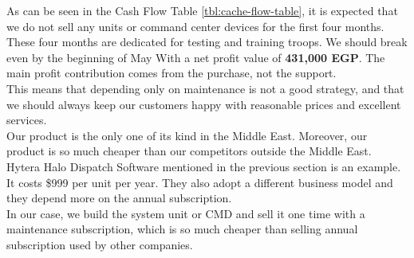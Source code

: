 As can be seen in the Cash  Flow  Table \ref{tbl:cache-flow-table}, it is expected that we do not sell any units or command center devices for the first four months. These four months are dedicated for testing and training troops. We should break even by the beginning of May With a net profit value of \textbf{431,000 EGP}. The main profit contribution comes from the purchase, not the support.
\\
This means that depending only on maintenance is not a good strategy, and that we should always keep our customers happy with reasonable prices and excellent services.
\\
Our product is the only one of its kind in the Middle East. Moreover, our product is so much cheaper than our competitors outside the Middle East. Hytera Halo Dispatch Software mentioned in the previous section is an example. It costs \$999 per unit per year. They also adopt a different business model and they depend more on the annual subscription.
\\
In our case, we build the system unit or CMD and sell it one time with a maintenance subscription, which is so much cheaper than selling annual subscription used by other companies.

